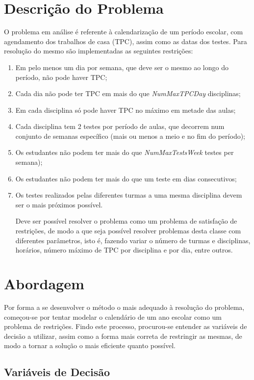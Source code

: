 \documentclass{llncs}
\begin{document}
\section{Descrição do Problema}
O problema em análise é referente à calendarização de um período escolar, com agendamento dos trabalhos de casa (TPC), assim como as datas dos testes. Para resolução do mesmo são implementadas as seguintes restrições:
\begin{enumerate}
	\item Em pelo menos um dia por semana, que deve ser o mesmo ao longo do período, não pode haver TPC;
	\item Cada dia não pode ter TPC em mais do que \textit{NumMaxTPCDay} disciplinas;
	\item Em cada disciplina só pode haver TPC no máximo em metade das aulas;
	\item Cada disciplina tem 2 testes por período de aulas, que decorrem num conjunto de semanas específico (mais ou menos a meio e no fim do período);
	\item Os estudantes não podem ter mais do que \textit{NumMaxTestsWeek} testes per semana);
	\item Os estudantes não podem ter mais do que um teste em dias consecutivos;
	\item Os testes realizados pelas diferentes turmas a uma mesma disciplina devem ser o mais próximos possível.
	
Deve ser possível resolver o problema como um problema de satisfação de restrições, de modo a que seja possível resolver problemas desta classe com diferentes parâmetros, isto é, fazendo variar o número de turmas e disciplinas, horários, número máximo de TPC por disciplina e por dia, entre outros.

\end{enumerate}

\section{Abordagem}

Por forma a se desenvolver o método o mais adequado à resolução do problema, começou-se por tentar modelar o calendário de um ano escolar como um problema de restrições. Findo este processo, procurou-se entender as variáveis de decisão a utilizar, assim como a forma mais correta de restringir as mesmas, de modo a tornar a solução o mais eficiente quanto possível.

\subsection{Variáveis de Decisão}
\end{document}
